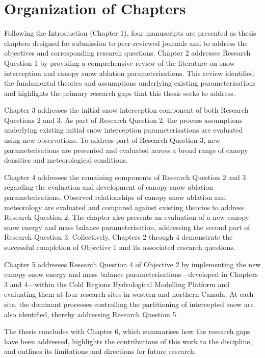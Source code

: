 \documentclass[
  letterpaper,
]{tex/uofsthesis-cs}
\begin{document}
\section{Organization of Chapters}\label{organization-of-chapters}

Following the Introduction (Chapter 1), four manuscripts are presented
as thesis chapters designed for submission to peer-reviewed journals and
to address the objectives and corresponding research questions. Chapter
2 addresses Research Question 1 by providing a comprehensive review of
the literature on snow interception and canopy snow ablation
parameterisations. This review identified the fundamental theories and
assumptions underlying existing parameterisations and highlights the
primary research gaps that this thesis seeks to address.

Chapter 3 addresses the initial snow interception component of both
Research Questions 2 and 3. As part of Research Question 2, the process
assumptions underlying existing initial snow interception
parameterisations are evaluated using new observations. To address part
of Research Question 3, new parameterisations are presented and
evaluated across a broad range of canopy densities and meteorological
conditions.

Chapter 4 addresses the remaining components of Research Question 2 and
3 regarding the evaluation and development of canopy snow ablation
parameterisations. Observed relationships of canopy snow ablation and
meteorology are evaluated and compared against existing theories to
address Research Question 2. The chapter also presents an evaluation of
a new canopy snow energy and mass balance parameterisation, addressing
the second part of Research Question 3. Collectively, Chapters 2 through
4 demonstrate the successful completion of Objective 1 and its
associated research questions.

Chapter 5 addresses Research Question 4 of Objective 2 by implementing
the new canopy snow energy and mass balance
parameterisations---developed in Chapters 3 and 4---within the Cold
Regions Hydrological Modelling Platform and evaluating them at four
research sites in western and northern Canada. At each site, the
dominant processes controlling the partitioning of intercepted snow are
also identified, thereby addressing Research Question 5.

The thesis concludes with Chapter 6, which summarises how the research
gaps have been addressed, highlights the contributions of this work to
the discipline, and outlines its limitations and directions for future
research.
\end{document}
